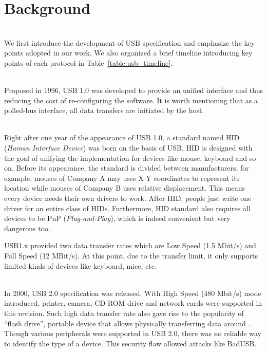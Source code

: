 \section{Background}
\label{sec:background}
\noindent{}\\
We first introduce the development of USB specification and emphasize the key points adopted in our work. We also organized a brief timeline introducing key points of each protocol in Table~\ref{table:usb_timeline}.

\noindent{}\\
Proposed in 1996, USB 1.0\cite{usb10} was developed to provide an unified interface and thus reducing the cost of re-configuring the software. It is worth mentioning that as a polled-bus interface, all data transfers are initiated by the host.

\noindent{}\\
Right after one year of the appearance of USB 1.0, a standard named HID (\emph{Human Interface Device}) was born on the basis of USB. HID is designed with the goal of unifying the implementation for devices like mouse, keyboard and so on. Before its appearance, the standard is divided between manufacturers, for example, mouses of Company A may uses X-Y coordinates to represent its location while mouses of Company B uses relative displacement. This means every device needs their own drivers to work. After HID, people just write one driver for an entire class of HIDs. Furthermore, HID standard also requires all devices to be PnP (\emph{Plug-and-Play}), which is indeed convenient but very dangerous too. 

USB1.x\cite{usb10}\cite{usb11} provided two data transfer rates which are Low Speed (1.5 Mbit/s) and Full Speed (12 MBit/s). At this point, due to the transfer limit, it only supports limited kinds of devices like keyboard, mice, etc.

\noindent{}\\
In 2000, USB 2.0\cite{usb20} specification was released. With High Speed (480 Mbit/s) mode introduced, printer, camera, CD-ROM drive and network cards were supported in this revision. Such high data transfer rate also gave rise to the popularity of ``flash drive'', portable device that allows physically transferring data around \cite{sok}. Though various peripherals were supported in USB 2.0, there was no reliable way to identify the type of a device. This security flaw allowed attacks like BadUSB\cite{rubber}.

